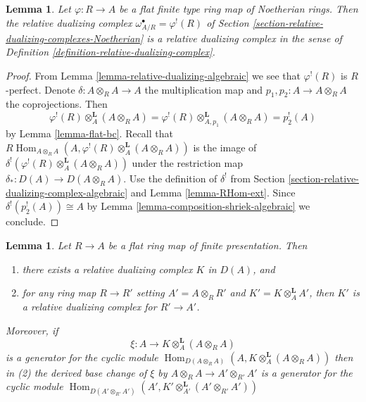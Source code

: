 \documentclass{stacks-project}
\theoremstyle{plain}
\newtheorem{lemma}[subsection]{Lemma}
\theoremstyle{definition}
\theoremstyle{remark}
\numberwithin{equation}{subsection}
\def\Hom{\mathop{\mathrm{Hom}}\nolimits}
\begin{document}
\begin{lemma}
\label{lemma-relative-dualizing-noetherian}
Let $\varphi : R \to A$ be a flat finite type ring map of Noetherian rings.
Then the relative dualizing complex $\omega_{A/R}^\bullet = \varphi^!(R)$
of Section \ref{section-relative-dualizing-complexes-Noetherian}
is a relative dualizing complex in the sense of
Definition \ref{definition-relative-dualizing-complex}.
\end{lemma}

\begin{proof}
From Lemma \ref{lemma-relative-dualizing-algebraic} we see that
$\varphi^!(R)$ is $R$-perfect.
Denote $\delta : A \otimes_R A \to A$ the multiplication map
and $p_1, p_2 : A \to A \otimes_R A$ the coprojections.
Then
$$
\varphi^!(R) \otimes_A^\mathbf{L} (A \otimes_R A) =
\varphi^!(R) \otimes_{A, p_1}^\mathbf{L} (A \otimes_R A) =
p_2^!(A)
$$
by Lemma \ref{lemma-flat-bc}. Recall that
$
R\Hom_{A \otimes_R A}(A, \varphi^!(R) \otimes_A^\mathbf{L} (A \otimes_R A))
$
is the image of $\delta^!(\varphi^!(R) \otimes_A^\mathbf{L} (A \otimes_R A))$
under the restriction map $\delta_* : D(A) \to D(A \otimes_R A)$.
Use the definition of $\delta^!$ from
Section \ref{section-relative-dualizing-complex-algebraic}
and Lemma \ref{lemma-RHom-ext}.
Since $\delta^!(p_2^!(A)) \cong A$ by
Lemma \ref{lemma-composition-shriek-algebraic}
we conclude.
\end{proof}

\begin{lemma}
\label{lemma-base-change-relative-dualizing}
Let $R \to A$ be a flat ring map of finite presentation. Then
\begin{enumerate}
\item there exists a relative dualizing complex $K$ in $D(A)$, and
\item for any ring map $R \to R'$ setting $A' = A \otimes_R R'$
and $K' = K \otimes_A^\mathbf{L} A'$, then $K'$ is a
relative dualizing complex for $R' \to A'$.
\end{enumerate}
Moreover, if
$$
\xi : A \longrightarrow K \otimes_A^\mathbf{L} (A \otimes_R A)
$$
is a generator for the cyclic module
$\Hom_{D(A \otimes_R A)}(A, K \otimes_A^\mathbf{L} (A \otimes_R A))$
then in (2) the derived base change of $\xi$ by
$A \otimes_R A \to A' \otimes_{R'} A'$ is a generator for
the cyclic module
$\Hom_{D(A' \otimes_{R'} A')}(A',
K' \otimes_{A'}^\mathbf{L} (A' \otimes_{R'} A'))$
\end{lemma}
\end{document}
